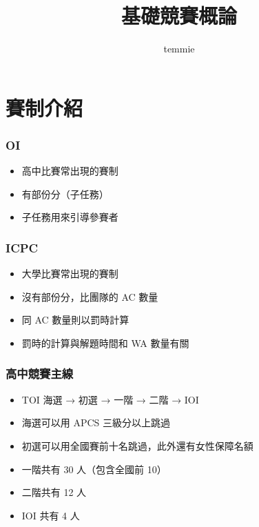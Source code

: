 \documentclass[mathserif]{beamer}
\title{基礎競賽概論}
\author{temmie}
\date{}
\begin{document}
\begin{frame}
    \titlepage
\end{frame}

\begin{frame}
    \tableofcontents
\end{frame}

\section{賽制介紹}

\begin{frame}
    \frametitle{OI}
    \begin{itemize}
        \item 高中比賽常出現的賽制
        \item 有部份分（子任務）
        \item 子任務用來引導參賽者
    \end{itemize}
\end{frame}

\begin{frame}
    \frametitle{ICPC}
    \begin{itemize}
        \item 大學比賽常出現的賽制
        \item 沒有部份分，比團隊的 AC 數量
        \item<2-> 同 AC 數量則以罰時計算
        \item<2-> 罰時的計算與解題時間和 WA 數量有關
    \end{itemize}
\end{frame}

\begin{frame}
    \frametitle{高中競賽主線}
    \begin{itemize}
        \item TOI 海選 → 初選 → 一階 → 二階 → IOI
        \vspace{0.5cm}
        \item<2-> 海選可以用 APCS 三級分以上跳過
        \item<2-> 初選可以用全國賽前十名跳過，此外還有女性保障名額
        \item<2-> 一階共有 30 人（包含全國前 10）
        \item<2-> 二階共有 12 人
        \item<2-> IOI 共有 4 人
    \end{itemize}
\end{frame}
\end{document}
